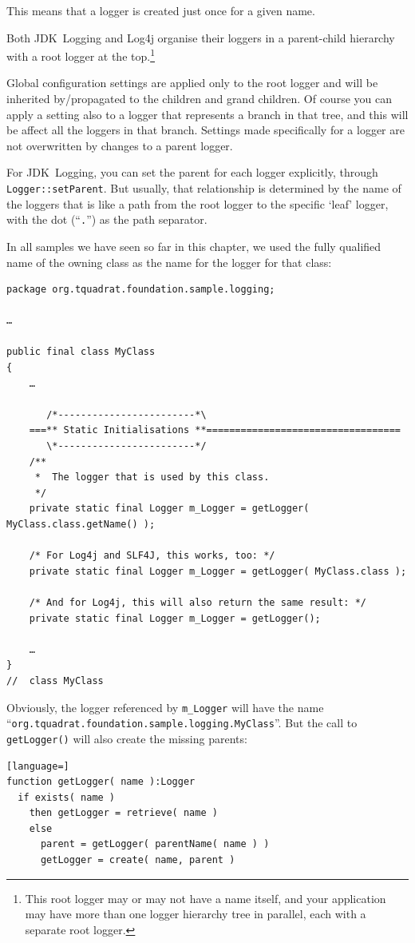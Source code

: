 \documentclass[11pt,a4paper, titlepage, parskip=half, headsepline, footsepline, cleardoublepage=current, headheight=1cm]{scrbook}
\begin{document}
This means that a logger is created just once for a given name.

Both JDK~Logging and Log4j organise their loggers in a parent-child hierarchy with a root logger at the top.\footnote{This root logger may or may not have a name itself, and your application may have more than one logger hierarchy tree in parallel, each with a separate root logger.}

Global configuration settings are applied only to the root logger and will be inherited by/propagated to the children and grand children. Of course you can apply a setting also to a logger that represents a branch in that tree, and this will be affect all the loggers in that branch. Settings made specifically for a logger are not overwritten by changes to a parent logger.

For JDK~Logging, you can set the parent for each logger explicitly, through \lstinline|Logger::setParent|\autocite{ORACLE_DOC_LOGGER:setParent}. But usually, that relationship is determined by the name of the loggers that is like a path from the root logger to the specific ‘leaf’ logger, with the dot (“\verb#.#”) as the path separator.

In all samples we have seen so far in this chapter, we used the fully qualified name of the owning class as the name for the logger for that class:
\begin{lstlisting}
package org.tquadrat.foundation.sample.logging;

…

public final class MyClass
{
    …
    
       /*------------------------*\
    ===** Static Initialisations **==================================
       \*------------------------*/
    /**
     *  The logger that is used by this class.
     */
    private static final Logger m_Logger = getLogger( MyClass.class.getName() );
    
    /* For Log4j and SLF4J, this works, too: */
    private static final Logger m_Logger = getLogger( MyClass.class );
    
    /* And for Log4j, this will also return the same result: */
    private static final Logger m_Logger = getLogger();
    
    …
}
//  class MyClass
\end{lstlisting}

Obviously, the logger referenced by \lstinline|m_Logger| will have the name “\verb#org.tquadrat.foundation.sample.logging.MyClass#”. But the call to \lstinline|getLogger()| will also create the missing parents:
\begin{lstlisting}[language=]
function getLogger( name ):Logger
  if exists( name )
    then getLogger = retrieve( name )
    else
      parent = getLogger( parentName( name ) )
      getLogger = create( name, parent )  
\end{lstlisting}
\end{document}
